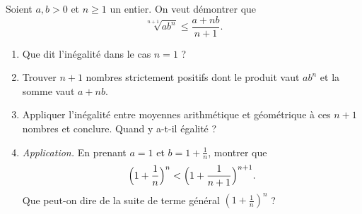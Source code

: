 Soient $a, b > 0$ et $n \geqslant 1$ un entier. On veut démontrer que
\[
\sqrt[n+1]{a b^n} \leqslant \frac{a + nb}{n+1}.
\]
\begin{enumerate}
  \item Que dit l'inégalité dans le cas $n = 1$ ?
  \item Trouver $n + 1$ nombres strictement positifs dont le produit vaut
  $ab^n$ et la somme vaut $a + nb$.
  \item Appliquer l'inégalité entre moyennes arithmétique et géométrique à ces
  $n+1$ nombres et conclure. Quand y a-t-il égalité ?
  \item \emph{Application.} En prenant $a = 1$ et $b = 1 + \frac1n$, montrer
  que
  \[
  \Bigl(1 + \frac1n\Bigr)^n < \Bigl(1 + \frac{1}{n+1}\Bigr)^{n+1}.
  \]
  Que peut-on dire de la suite de terme général $\left(1 + \frac1n\right)^n$ ?
\end{enumerate}
